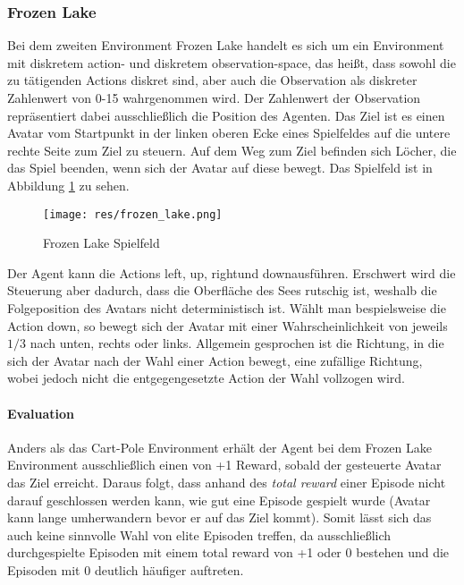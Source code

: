 \documentclass[11pt]{scrartcl}
\begin{document}
\subsubsection{Frozen Lake}
Bei dem zweiten Environment Frozen Lake handelt es sich um ein Environment mit diskretem action-
und diskretem observation-space, das heißt, dass sowohl die zu tätigenden Actions diskret sind,
aber auch die Observation als diskreter Zahlenwert von 0-15 wahrgenommen wird. Der Zahlenwert
der Observation repräsentiert dabei ausschließlich die Position des Agenten.
Das Ziel ist es einen Avatar vom Startpunkt in der linken oberen Ecke
eines Spielfeldes auf die untere rechte Seite zum Ziel zu steuern. Auf dem Weg zum Ziel
befinden sich Löcher, die das Spiel beenden, wenn sich der Avatar auf diese bewegt. Das Spielfeld 
ist in Abbildung \ref{fig:frozen_lake} zu sehen.

\begin{figure}[htp]
\centering
\texttt{[image: res/frozen\_lake.png]}
\caption{Frozen Lake Spielfeld}
\label{fig:frozen_lake}
\end{figure}

\noindent
Der Agent kann die Actions \grqq left\grqq, \grqq up\grqq, \grqq right\grqq und \grqq
down\grqq ausführen. Erschwert wird die Steuerung aber dadurch, dass die Oberfläche des
Sees rutschig ist, weshalb die Folgeposition des Avatars nicht deterministisch ist.
Wählt man bespielsweise die Action \grqq down\grqq, so bewegt sich der Avatar mit einer
Wahrscheinlichkeit von jeweils $1/3$ nach unten, rechts oder links. Allgemein gesprochen
ist die Richtung, in die sich der Avatar nach der Wahl einer Action bewegt, eine zufällige
Richtung, wobei jedoch nicht die entgegengesetzte Action der Wahl vollzogen wird.

\paragraph*{Evaluation}
\noindent
\newline
Anders als das Cart-Pole Environment erhält der Agent bei dem Frozen Lake Environment ausschließlich
einen von +1 Reward, sobald der gesteuerte Avatar das Ziel erreicht. Daraus folgt, dass anhand des
\textit{total reward} einer Episode nicht darauf geschlossen werden kann, wie gut eine Episode gespielt
wurde (Avatar kann lange umherwandern bevor er auf das Ziel kommt). Somit lässt sich das auch keine
sinnvolle Wahl von elite Episoden treffen, da ausschließlich durchgespielte Episoden mit einem total
reward von +1 oder 0 bestehen und die Episoden mit 0 deutlich häufiger auftreten.
\end{document}
